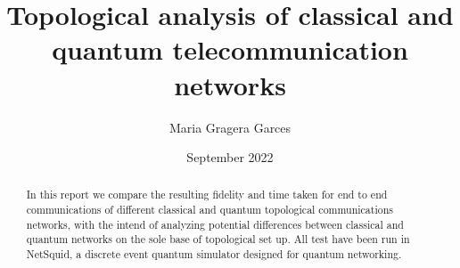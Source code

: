 \documentclass{article}
\begin{document}
    
\title{Topological analysis of classical and quantum telecommunication networks}
\author{Maria Gragera Garces}

\date{September 2022}

\maketitle

\begin{abstract}
    In this report we compare the resulting fidelity and time taken for end to end communications of different classical and quantum topological communications networks, with the intend of analyzing potential differences between classical and quantum networks on the sole base of topological set up.
    All test have been run in NetSquid, a discrete event quantum simulator designed for quantum networking.
\end{abstract}
\end{document}
